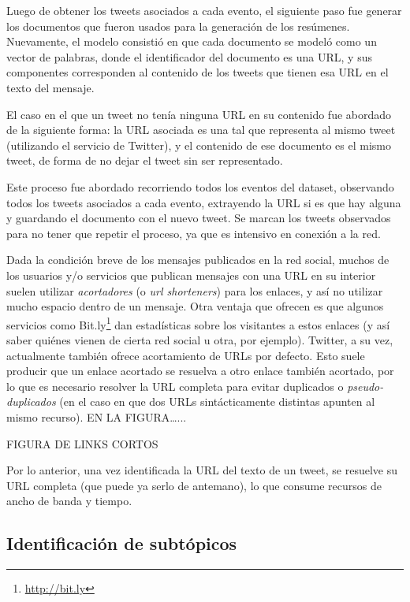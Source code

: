 \documentclass[upright, contnum]{umemoria}
\begin{document}
    Luego de obtener los tweets asociados a cada evento, el siguiente
    paso fue generar los documentos que fueron usados para la
    generación de los resúmenes. Nuevamente, el modelo consistió en que cada
    documento se modeló como un vector de palabras, donde el
    identificador del documento es una URL, y sus componentes
    corresponden al contenido de los tweets que tienen esa URL en el
    texto del mensaje.

    El caso en el que un tweet no tenía ninguna URL en su contenido
    fue abordado de la siguiente forma: la URL asociada es una tal que
    representa al mismo tweet (utilizando el servicio de Twitter), y
    el contenido de ese documento es el mismo tweet, de forma de no
    dejar el tweet sin ser representado.

    Este proceso fue abordado recorriendo todos los eventos del
    dataset, observando todos los tweets asociados a cada evento,
    extrayendo la URL si es que hay alguna y guardando el documento
    con el nuevo tweet. Se marcan los tweets observados para no tener
    que repetir el proceso, ya que es intensivo en conexión a la red.

    Dada la condición breve de los mensajes publicados en la red
    social, muchos de los usuarios y/o servicios que publican mensajes
    con una URL en su interior suelen utilizar \emph{acortadores} 
    (o \emph{url shorteners}) para los enlaces, y así no utilizar mucho
    espacio dentro de un
    mensaje. Otra ventaja que ofrecen es que algunos servicios como
    Bit.ly\footnote{\href{http://bit.ly}{http://bit.ly} } dan estadísticas sobre los visitantes a
    estos enlaces (y así saber quiénes vienen de cierta red social u
    otra, por ejemplo). Twitter, a su vez, actualmente también ofrece
    acortamiento de URLs por defecto. Esto suele producir que un enlace
    acortado se resuelva a otro enlace también acortado, por lo que es
    necesario resolver la URL completa para evitar duplicados o
    \emph{pseudo-duplicados} (en el caso en que dos URLs sintácticamente
    distintas apunten al mismo recurso). EN LA FIGURA\ldots{}...

    FIGURA DE LINKS CORTOS

    Por lo anterior, una vez identificada la URL del texto de un
    tweet, se resuelve su URL completa (que puede ya serlo de
    antemano), lo que consume recursos de ancho de banda y
    tiempo. 

\subsection{Identificación de subtópicos}
\label{sec-4.2.2}
\end{document}
